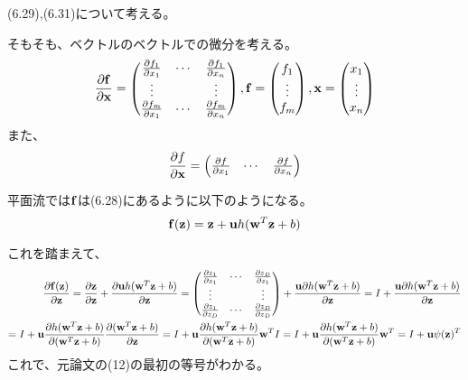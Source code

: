 ﻿\documentclass{jsarticle}
\begin{document}
(6.29),(6.31)について考える。

そもそも、ベクトルのベクトルでの微分を考える。
\begin{equation}
\frac{\partial{\bf f}}{\partial {\bf x}} =
\begin{pmatrix}
\frac{\partial f_1}{\partial x_1} & \cdots & \frac{\partial f_1}{\partial x_n} \\
\vdots & & \vdots\\
\frac{\partial f_m}{\partial x_1} & \cdots & \frac{\partial f_m}{\partial x_n} 
\end{pmatrix},
{\bf f} =
\begin{pmatrix}
f_1 \\
\vdots\\
f_m
\end{pmatrix},
{\bf x} =
\begin{pmatrix}
x_1 \\
\vdots\\
x_n
\end{pmatrix}
\end{equation}
また、
\begin{equation}
\frac{\partial f}{\partial {\bf x}} =
\begin{pmatrix}
\frac{\partial f}{\partial x_1} & \cdots & \frac{\partial f}{\partial x_n} \\
\end{pmatrix}
\end{equation}

平面流では${\bf f}$は(6.28)にあるように以下のようになる。
\begin{equation}
{\bf f}({\bf z}) = {\bf z} + {\bf u} h({\bf w}^T {\bf z} + b)
\end{equation}

これを踏まえて、
\begin{equation}
\begin{split}
\frac{\partial{\bf f}({\bf z})}{\partial {\bf z}} = \frac{\partial {\bf z}}{\partial {\bf z}} + \frac{\partial {\bf u} h({\bf w}^T {\bf z} + b)}{\partial {\bf z}}
=
\begin{pmatrix}
\frac{\partial z_1}{\partial z_1} & \cdots & \frac{\partial z_D}{\partial z_1} \\
\vdots & & \vdots \\
\frac{\partial z_1}{\partial z_D} & \cdots & \frac{\partial z_D}{\partial z_D} 
\end{pmatrix}
+ \frac{{\bf u} \partial h({\bf w}^T {\bf z} + b)}{\partial {\bf z}}
= I + \frac{{\bf u} \partial h({\bf w}^T {\bf z} + b)}{\partial {\bf z}}\\
= I + {\bf u} \frac{\partial h({\bf w}^T {\bf z} + b)}{\partial ({\bf w}^T {\bf z} + b)}\frac{\partial ({\bf w}^T {\bf z} + b)}{\partial {\bf z}}
= I + {\bf u} \frac{\partial h({\bf w}^T {\bf z} + b)}{\partial ({\bf w}^T {\bf z} + b)}{\bf w}^T I
= I + {\bf u} \frac{\partial h({\bf w}^T {\bf z} + b)}{\partial ({\bf w}^T {\bf z} + b)}{\bf w}^T
= I + {\bf u} \psi({\bf z})^T
\end{split}
\end{equation}
これで、元論文の(12)の最初の等号がわかる。
\end{document}
